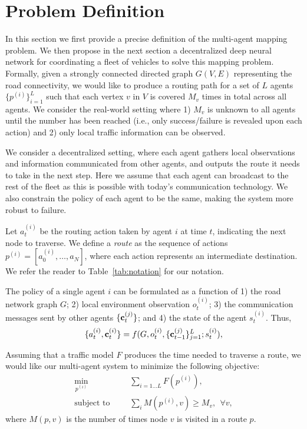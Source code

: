 \section{Problem Definition}

In this section we first provide a precise definition of the multi-agent mapping problem. We then
propose in the next section a decentralized deep neural network for coordinating a fleet of vehicles
to solve this mapping problem. Formally, given a strongly connected directed  graph $G(V,E)$
representing the road connectivity, we would like to produce a routing path for a set of $L$ agents
$\{p^{(i)}\}_{i=1}^L$ such that each vertex $v$ in $V$ is covered $M_v$ times in total across all
agents. We  consider the real-world  setting where 1) $M_v$ is unknown to all agents until the
number has been reached (i.e., only success/failure is revealed upon each action) and 2) only local
traffic information can be observed.

We consider a decentralized setting, where each agent gathers local observations and
information communicated from other agents, and outputs the route it needs to take in the next step.
Here we assume that each agent can broadcast to the rest of the fleet as this is possible with
today's communication technology. We also constrain  the policy of
each agent to be the same, making the system more robust to failure.

Let $a_t^{(i)}$ be the routing action taken by agent $i$ at time $t$, indicating the next node to
traverse. We define a  {\it route} as the sequence of actions $p^{(i)} = [a_0^{(i)}, \dots,
a_N]$, where each action represents an intermediate destination.
We refer the reader to
Table~\ref{tab:notation} for our notation.

The policy of a single agent $i$ can be formulated as a function of 1) the road network graph $G$; 2) local
environment observation $o_t^{(i)}$; 3) the communication messages sent by other agents
$\{\mathbf{c}_t^{(j)}\}$; and 4) the state of the agent $s_t^{(i)}$.
Thus,
\begin{align}
\{a_t^{(i)}, \mathbf{c}_t^{(i)}\} = f(G, o_t^{(i)}, \{\mathbf{c}_{t-1}^{(j)}\}_{j=1}^L; s_t^{(i)}),
\end{align}



Assuming that a traffic model $F$ produces the time needed to traverse a route, we would like our
multi-agent system to minimize the following objective:
\begin{align}
\min_{p^(i)}      &&& \sum_{i=1 \dots L} F(p^{(i)}), \\
\text{subject to} &&& \nonumber \sum_i M(p^{(i)}, v) \ge M_v, \ \ \forall v,
\end{align}
where $M(p, v)$ is the number of times node $v$ is visited in a route $p$.

